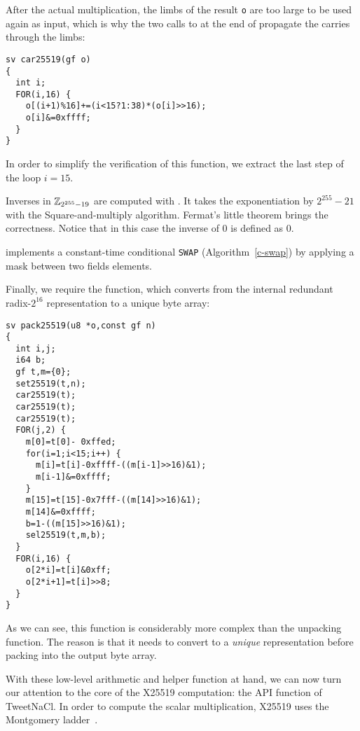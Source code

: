After the actual multiplication, the limbs of the result \texttt{o} are
too large to be used again as input, which is why the two calls to
 at the end of  propagate the carries through the limbs:
\begin{lstlisting}[language=Ctweetnacl]
sv car25519(gf o)
{
  int i;
  FOR(i,16) {
    o[(i+1)%16]+=(i<15?1:38)*(o[i]>>16);
    o[i]&=0xffff;
  }
}
\end{lstlisting}

In order to simplify the verification of this function,
we extract the last step of the loop $i = 15$.

Inverses in $\mathbb{Z}_{2^{255}-19}$ are computed with .
It takes the exponentiation by $2^{255}-21$ with the Square-and-multiply algorithm.
Fermat's little theorem brings the correctness.
Notice that in this case the inverse of $0$ is defined as $0$.

 implements a constant-time conditional \texttt{SWAP} (Algorithm~\ref{c-swap})
by applying a mask between two fields elements.

Finally, we require the  function,
which converts from the internal redundant radix-$2^{16}$
representation to a unique byte array:
\begin{lstlisting}[language=Ctweetnacl]
sv pack25519(u8 *o,const gf n)
{
  int i,j;
  i64 b;
  gf t,m={0};
  set25519(t,n);
  car25519(t);
  car25519(t);
  car25519(t);
  FOR(j,2) {
    m[0]=t[0]- 0xffed;
    for(i=1;i<15;i++) {
      m[i]=t[i]-0xffff-((m[i-1]>>16)&1);
      m[i-1]&=0xffff;
    }
    m[15]=t[15]-0x7fff-((m[14]>>16)&1);
    m[14]&=0xffff;
    b=1-((m[15]>>16)&1);
    sel25519(t,m,b);
  }
  FOR(i,16) {
    o[2*i]=t[i]&0xff;
    o[2*i+1]=t[i]>>8;
  }
}
\end{lstlisting}

As we can see, this function is considerably more complex than the
unpacking function. The reason is that it needs to convert
to a \emph{unique} representation before packing into the output
byte array.

With these low-level arithmetic and helper function at hand, we can now
turn our attention to the core of the X25519 computation:
the  API function of TweetNaCl.
In order to compute the scalar multiplication,
X25519 uses the Montgomery ladder~\cite{Mon85}.


